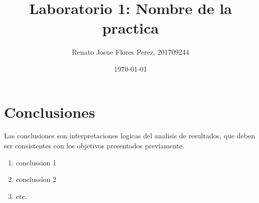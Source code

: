\documentclass[osajnl,onecolumn,showpacs,superscriptaddress,10pt]{revtex4-1}
\begin{document}
\title{Laboratorio 1: Nombre de la practica}

\author{Renato Josue Flores Perez, 201709244}

\date{\today}

\maketitle{}

\section{Conclusiones}

Las conclusiones son interpretaciones logicas del analisis de resultados, que
deben ser consistentes con los objetivos presentados previamente. 

\begin{enumerate}
\item conclussion 1
\item conclussion 2
\item etc.
\end{enumerate}
\end{document}
